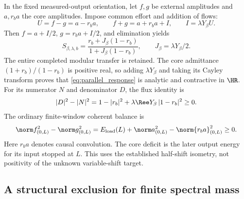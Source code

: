 In the fixed measured-output orientation, let $f,g$ be external
amplitudes and $a,r_ba$ the core amplitudes. Impose common effort and
addition of flows:
\begin{equation}
 U=f-g=a-r_ba,\qquad f+g=a+r_ba+I,\qquad I=\lambda Y_\beta U.
\end{equation}
Then $f=a+I/2$, $g=r_ba+I/2$, and elimination yields
\begin{equation}
 S_{\beta,\lambda,b}
 =\frac{r_b+J_\beta(1-r_b)}{1+J_\beta(1-r_b)},\qquad
 J_\beta=\lambda Y_\beta/2.
 \label{eq:parallel_response}
\end{equation}
The entire completed modular transfer is retained. The core admittance
$(1+r_b)/(1-r_b)$ is positive real, so adding $\lambda Y_\beta$
and taking its Cayley transform proves that
\eqref{eq:parallel_response} is analytic and contractive in $\HR$.
For its numerator $N$ and denominator $D$, the flux identity is
\begin{equation}
 |D|^2-|N|^2=1-|r_b|^2+\lambda\Ree Y_\beta\,|1-r_b|^2\ge0.
\end{equation}
The ordinary finite-window coherent balance is
\begin{equation}
 \norm f_{(0,L)}^2-\norm g_{(0,L)}^2
 =E_{\rm load}(L)+\norm a_{(0,L)}^2-\norm{r_ba}_{(0,L)}^2\ge0.
 \label{eq:parallel_energy}
\end{equation}
Here $r_ba$ denotes causal convolution. The core deficit is the later
output energy for its input stopped at $L$. This uses the established
half-shift isometry, not positivity of the unknown variable-shift target.

\subsection{A structural exclusion for finite spectral mass}

